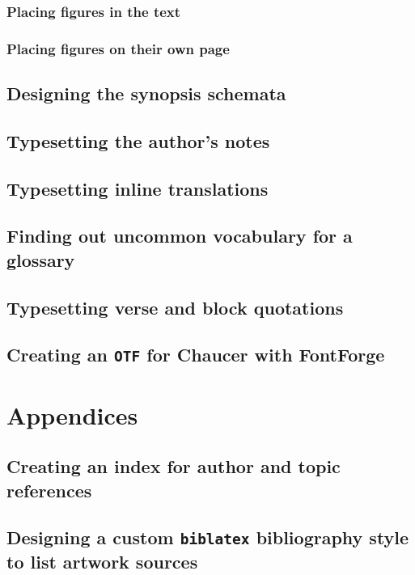 \documentclass[12pt,a4,oneside,usenames,dvipsnames]{book}
\newcommand\biblatex{\texttt{biblatex}\xspace}%
\begin{document}
\section{Placing figures in the text}
\skelpar

\section{Placing figures on their own page}
\skelpar

\chapter{Designing the synopsis schemata}

\chapter{Typesetting the author's notes}

\chapter{Typesetting inline translations}

\chapter{Finding out uncommon vocabulary for a glossary}

\chapter{Typesetting verse and block quotations}

\chapter{Creating an \texttt{OTF} for Chaucer with FontForge}

\part{Appendices}

\chapter{Creating an index for author and topic references}

\chapter{Designing a custom \biblatex bibliography style to list artwork sources}
\end{document}
